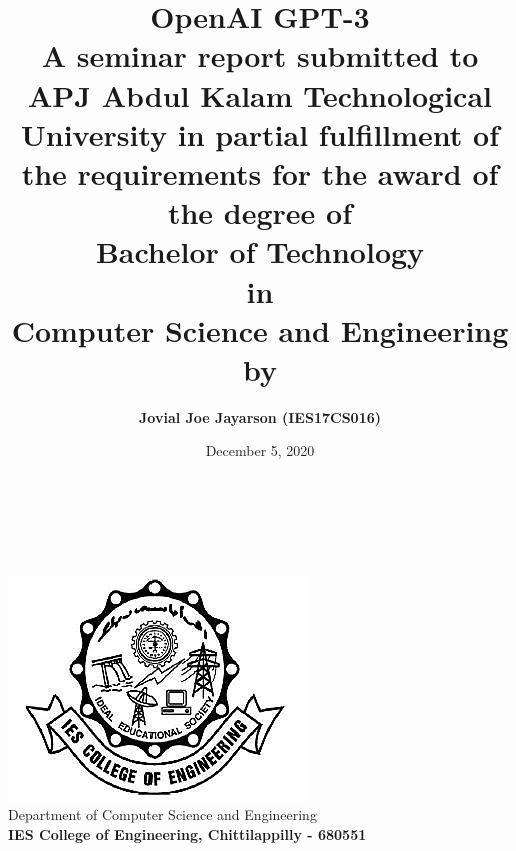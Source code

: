 \documentclass[12pt, a4paper]{report}
\title{\textbf{OpenAI GPT-3} \\ \vspace{1cm} \large A seminar report submitted to APJ Abdul Kalam Technological University in partial fulfillment of the requirements for the award of the degree of \\ \vspace{0.5cm} \large \textbf{Bachelor of Technology \\ in \\ Computer Science and Engineering} \\ \vspace{0.5cm} \large by}
\author{\textbf{Jovial Joe Jayarson (IES17CS016)}}
\date{December 5, 2020}
\begin{document}

\makeatletter
\thispagestyle{empty}
\begin{titlepage}
    \begin{center}
        \vspace*{\fill}
        {\huge \@title }\\[0.5cm]
        {\@author} \\[0.5cm]
        {\@date}\\[10ex]
        \includegraphics[width=0.5\linewidth]{iesce.png}\\[10ex]
        {\large Department of Computer Science and Engineering \\ \textbf{IES College of Engineering, Chittilappilly - 680551}}
        \vspace*{\fill}
    \end{center}
\end{titlepage}

\end{document}
